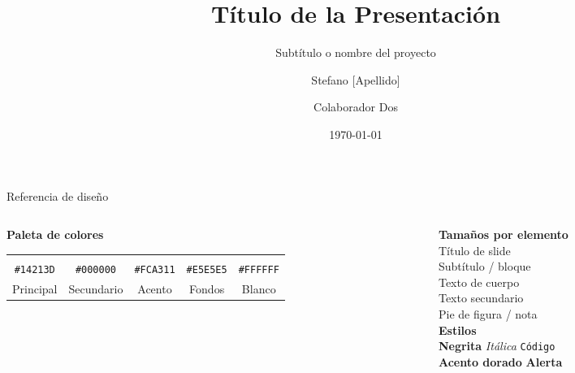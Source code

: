 \documentclass[aspectratio=169, 11pt]{beamer}
\title{Título de la Presentación}
\subtitle{Subtítulo o nombre del proyecto}
\author{Stefano [Apellido] \and Colaborador Dos}
\institute{%
  Departamento de Química \\
  Universidad / Centro de Investigación \\
  {\small\texttt{correo@institucion.cl}}
}
\date{\today}
\begin{document}

\maketitle

\begin{frame}{Referencia de diseño}
  \begin{columns}[T]

    \begin{column}{0.55\textwidth}
      {\large\textbf{Paleta de colores}}\\[0.8em]

      \begin{tabular}{ccccc}
        \colorbox{cNavy}{\rule{0pt}{1.2em}\hspace{2.2em}} &
        \colorbox{cNegro}{\rule{0pt}{1.2em}\hspace{2.2em}} &
        \colorbox{cDorado}{\rule{0pt}{1.2em}\hspace{2.2em}} &
        \colorbox{cGrisClaro}{\rule{0pt}{1.2em}\hspace{2.2em}} &
        \colorbox{white}{\rule{0pt}{1.2em}\hspace{2.2em}} \\[0.3em]
        {\tiny\texttt{\#14213D}} &
        {\tiny\texttt{\#000000}} &
        {\tiny\texttt{\#FCA311}} &
        {\tiny\texttt{\#E5E5E5}} &
        {\tiny\texttt{\#FFFFFF}} \\[0.2em]
        {\tiny Principal} &
        {\tiny Secundario} &
        {\tiny Acento} &
        {\tiny Fondos} &
        {\tiny Blanco} \\
      \end{tabular}
    \end{column}

    \begin{column}{0.42\textwidth}
      {\large\textbf{Tamaños por elemento}}\\[0.5em]
      {\LARGE Título de slide}\\[0.2em]
      {\Large Subtítulo / bloque}\\[0.2em]
      {\normalsize Texto de cuerpo}\\[0.2em]
      {\small Texto secundario}\\[0.2em]
      {\footnotesize Pie de figura / nota}\\[0.8em]

      {\large\textbf{Estilos}}\\[0.4em]
      \textbf{Negrita}\quad
      \textit{Itálica}\quad
      \texttt{Código}\\[0.3em]
      \textcolor{cDorado}{\textbf{Acento dorado}}\quad
      \alert{\textbf{Alerta}}\\
    \end{column}

  \end{columns}
\end{frame}
\end{document}
